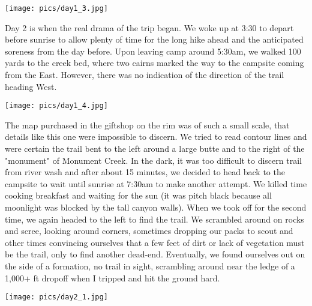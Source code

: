 \documentclass[10pt,a4paper]{article}
\newenvironment{Figure}
  {\par\medskip\noindent\minipage{\linewidth}}
  {\endminipage\par\medskip}
\begin{document}
\begin{multicols}{2}
\begin{Figure}
 \centering
 \texttt{[image: pics/day1\_3.jpg]}
\end{Figure}

Day 2 is when the real drama of the trip began. We woke up at 3:30 to depart before sunrise to allow plenty of time for the long hike ahead and the anticipated soreness from the day before. Upon leaving camp around 5:30am, we walked 100 yards to the creek bed, where two cairns marked the way to the campsite coming from the East. However, there was no indication of the direction of the trail heading West. 

\begin{Figure}
 \centering
 \texttt{[image: pics/day1\_4.jpg]}
\end{Figure}


The map purchased in the giftshop on the rim was of such a small scale, that details like this one were impossible to discern. We tried to read contour lines and were certain the trail bent to the left around a large butte and to the right of the "monument" of Monument Creek. In the dark, it was too difficult to discern trail from river wash and after about 15 minutes, we decided to head back to the campsite to wait until sunrise at 7:30am to make another attempt. We killed time cooking breakfast and waiting for the sun (it was pitch black because all moonlight was blocked by the tall canyon walls). When we took off for the second time, we again headed to the left to find the trail. We scrambled around on rocks and scree, looking around corners, sometimes dropping our packs to scout and other times convincing ourselves that a few feet of dirt or lack of vegetation must be the trail, only to find another dead-end. Eventually, we found ourselves out on the side of a formation, no trail in sight, scrambling around near the ledge of a 1,000+ ft dropoff when I tripped and hit the ground hard.

\begin{Figure}
 \centering
 \texttt{[image: pics/day2\_1.jpg]}
\end{Figure}


\end{multicols}
\end{document}
